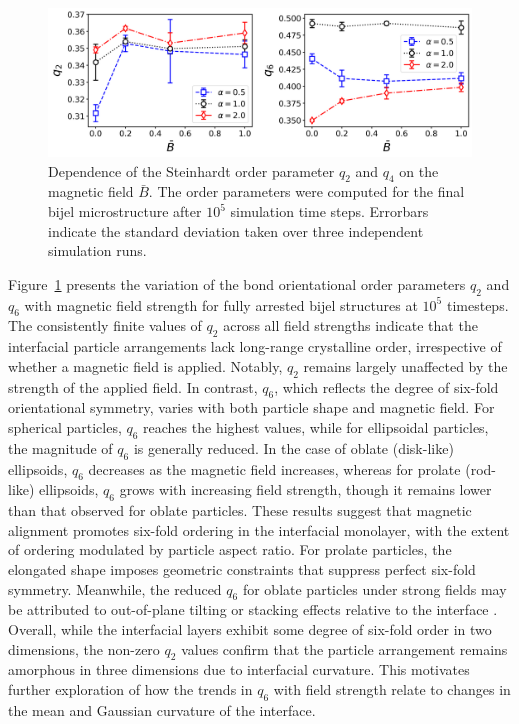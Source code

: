 \begin{figure}
\centering
\includegraphics[scale=0.45]{../figures/results/paper1_5/steinhardt_field.png}%
\caption{Dependence of the Steinhardt order parameter $q_2$ and $q_4$ on the magnetic field $\bar{B}$. The order parameters were computed for the final 
         bijel microstructure after $10^5$ simulation time steps. Errorbars indicate the standard deviation taken over three independent simulation runs.
\label{fig:steinhardt_field}}%
\end{figure}

Figure~\ref{fig:steinhardt_field} presents the variation of the bond orientational order parameters \(q_2\) and \(q_6\) with magnetic field strength for fully arrested bijel structures at \(10^5\) 
timesteps. The consistently finite values of \(q_2\) across all field strengths indicate that the interfacial particle arrangements lack long-range crystalline order, irrespective of whether a magnetic 
field is applied. Notably, \(q_2\) remains largely unaffected by the strength of the applied field. In contrast, \(q_6\), which reflects the degree of six-fold orientational symmetry, varies with both 
particle shape and magnetic field. For spherical particles, \(q_6\) reaches the highest values, while for ellipsoidal particles, the magnitude of \(q_6\) is generally reduced. In the case of oblate 
(disk-like) ellipsoids, \(q_6\) decreases as the magnetic field increases, whereas for prolate (rod-like) ellipsoids, \(q_6\) grows with increasing field strength, though it remains lower than that 
observed for oblate particles. These results suggest that magnetic alignment promotes six-fold ordering in the interfacial monolayer, with the extent of ordering modulated by particle aspect ratio. 
For prolate particles, the elongated shape imposes geometric constraints that suppress perfect six-fold symmetry. Meanwhile, the reduced \(q_6\) for oblate particles under strong fields may be attributed 
to out-of-plane tilting or stacking effects relative to the interface \cite{dabat_mesoscale_2018}. Overall, while the interfacial layers exhibit some degree of six-fold order in two dimensions, the 
non-zero \(q_2\) values confirm that the particle arrangement remains amorphous in three dimensions due to interfacial curvature. This motivates further exploration of how the trends in \(q_6\) with 
field strength relate to changes in the mean and Gaussian curvature of the interface.

